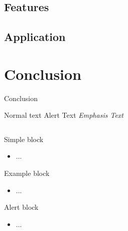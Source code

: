 \documentclass{if-beamer}
\begin{document}
\subsection{Features}
\subsection{Application}





\section{Conclusion}
\begin{frame}{Conclusion}

Normal text \alert{Alert Text}   \emph{Emphasis Text}
\begin{columns}

\begin{column}{0.5\textwidth}

\begin{block}{Simple block}
  \begin{itemize}
  	\item ...
  \end{itemize}
\end{block}

\begin{exampleblock}{Example block}
  \begin{itemize}
  	\item ...
  \end{itemize}
\end{exampleblock}

\begin{alertblock}{Alert block}
  \begin{itemize}
  	\item ...
  \end{itemize}
\end{alertblock}

\end{column}

\begin{column}{0.5\textwidth}




\end{column}
\end{columns}
\end{frame}
\end{document}
